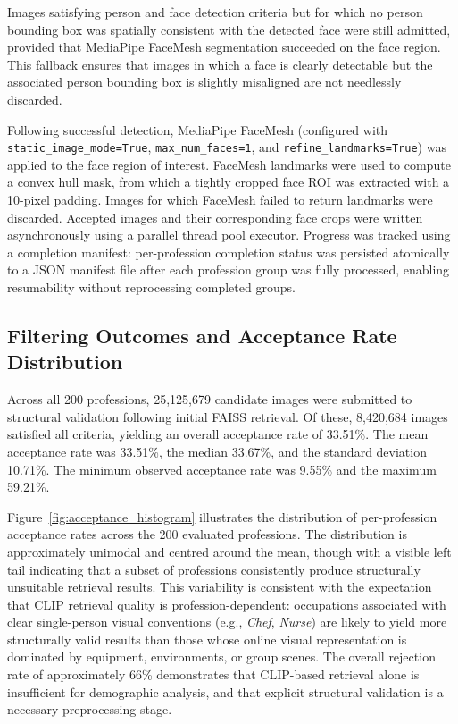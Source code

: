 Images satisfying person and face detection criteria but for which no
person bounding box was spatially consistent with the detected face were
still admitted, provided that MediaPipe FaceMesh segmentation succeeded on
the face region. This fallback ensures that images in which a face is
clearly detectable but the associated person bounding box is slightly
misaligned are not needlessly discarded.

Following successful detection, MediaPipe FaceMesh (configured with
\texttt{static\_image\_mode=True}, \texttt{max\_num\_faces=1}, and
\texttt{refine\_landmarks=True}) was applied to the face region of
interest. FaceMesh landmarks were used to compute a convex hull mask, from
which a tightly cropped face ROI was extracted with a 10-pixel padding.
Images for which FaceMesh failed to return landmarks were discarded.
Accepted images and their corresponding face crops were written
asynchronously using a parallel thread pool executor. Progress was tracked
using a completion manifest: per-profession completion status was persisted
atomically to a JSON manifest file after each profession group was fully
processed, enabling resumability without reprocessing completed groups.

\subsection{Filtering Outcomes and Acceptance Rate Distribution}

Across all 200 professions, 25{,}125{,}679 candidate images were submitted
to structural validation following initial FAISS retrieval. Of these,
8{,}420{,}684 images satisfied all criteria, yielding an overall acceptance
rate of 33.51\%. The mean acceptance rate was 33.51\%, the median 33.67\%,
and the standard deviation 10.71\%. The minimum observed acceptance rate
was 9.55\% and the maximum 59.21\%.

Figure~\ref{fig:acceptance_histogram} illustrates the distribution of
per-profession acceptance rates across the 200 evaluated professions. The
distribution is approximately unimodal and centred around the mean, though
with a visible left tail indicating that a subset of professions
consistently produce structurally unsuitable retrieval results. This
variability is consistent with the expectation that CLIP retrieval quality
is profession-dependent: occupations associated with clear single-person
visual conventions (e.g., \emph{Chef}, \emph{Nurse}) are likely to yield
more structurally valid results than those whose online visual
representation is dominated by equipment, environments, or group scenes.
The overall rejection rate of approximately 66\% demonstrates that
CLIP-based retrieval alone is insufficient for demographic analysis, and
that explicit structural validation is a necessary preprocessing stage.

